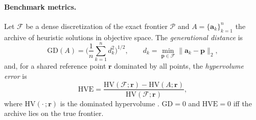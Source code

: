\paragraph{Benchmark metrics.}
Let $\mathcal{F}$ be a dense discretization of the exact frontier $\mathcal{P}$ and
$A=\{\mathbf{a}_k\}_{k=1}^{n}$ the archive of heuristic solutions in objective space.
The \emph{generational distance} is
\begin{equation}
  \mathrm{GD}(A)=\Big(\frac{1}{n}\sum_{k=1}^{n} d_k^{2}\Big)^{1/2},
  \qquad d_k=\min_{\mathbf{p}\in\mathcal{F}}\lVert \mathbf{a}_k-\mathbf{p}\rVert_2 ,
  \label{eq:gd}
\end{equation}
and, for a shared reference point $\mathbf{r}$ dominated by all points, the
\emph{hypervolume error} is
\begin{equation}
  \mathrm{HVE}=\frac{\mathrm{HV}(\mathcal{F};\mathbf{r})-\mathrm{HV}(A;\mathbf{r})}
  {\mathrm{HV}(\mathcal{F};\mathbf{r})},
  \label{eq:hve}
\end{equation}
where $\mathrm{HV}(\cdot\,;\mathbf{r})$ is the dominated hypervolume \citep{zitzler1999hv}.
$\mathrm{GD}=0$ and $\mathrm{HVE}=0$ iff the archive lies on the true frontier.
